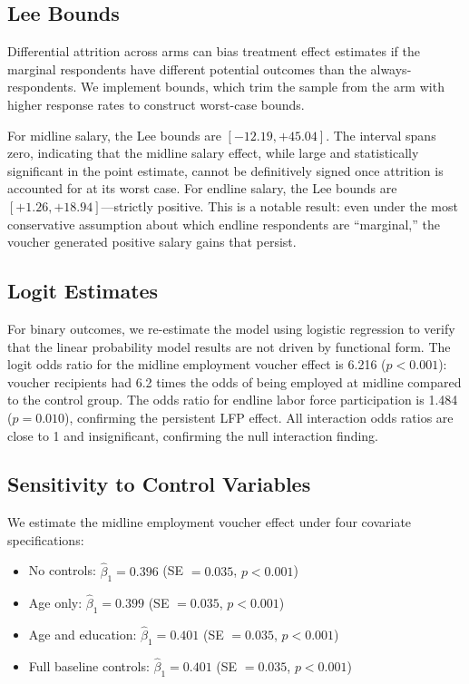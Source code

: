 \documentclass[12pt]{article}
\begin{document}
\subsection{Lee Bounds}

Differential attrition across arms can bias treatment effect estimates if the marginal respondents have different potential outcomes than the always-respondents. We implement \citet{lee2009training} bounds, which trim the sample from the arm with higher response rates to construct worst-case bounds.

For midline salary, the Lee bounds are $[-12.19, +45.04]$. The interval spans zero, indicating that the midline salary effect, while large and statistically significant in the point estimate, cannot be definitively signed once attrition is accounted for at its worst case. For endline salary, the Lee bounds are $[+1.26, +18.94]$---strictly positive. This is a notable result: even under the most conservative assumption about which endline respondents are ``marginal,'' the voucher generated positive salary gains that persist.

\subsection{Logit Estimates}

For binary outcomes, we re-estimate the model using logistic regression to verify that the linear probability model results are not driven by functional form. The logit odds ratio for the midline employment voucher effect is 6.216 ($p < 0.001$): voucher recipients had 6.2 times the odds of being employed at midline compared to the control group. The odds ratio for endline labor force participation is 1.484 ($p = 0.010$), confirming the persistent LFP effect. All interaction odds ratios are close to 1 and insignificant, confirming the null interaction finding.

\subsection{Sensitivity to Control Variables}

We estimate the midline employment voucher effect under four covariate specifications:
\begin{itemize}[leftmargin=2cm]
    \item No controls: $\hat{\beta}_1 = 0.396$ (SE $= 0.035$, $p < 0.001$)
    \item Age only: $\hat{\beta}_1 = 0.399$ (SE $= 0.035$, $p < 0.001$)
    \item Age and education: $\hat{\beta}_1 = 0.401$ (SE $= 0.035$, $p < 0.001$)
    \item Full baseline controls: $\hat{\beta}_1 = 0.401$ (SE $= 0.035$, $p < 0.001$)
\end{itemize}
\end{document}

